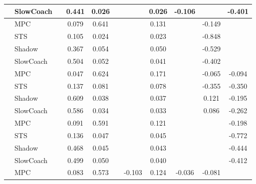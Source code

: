 \begin{tabular}{|l|l|*{9}{c|}}
                                                           & SlowCoach &       &     0.441 &     0.026 &     &     &  0.026 &  -0.106 &      &   -0.401 \\
\midrule
[False, True, True, False, False, True, False, True, False] & MPC &       &     0.079 &     0.641 &     &     &  0.131 &      &  -0.149 &       \\
                                                           & STS &       &     0.105 &     0.024 &     &     &  0.023 &      &  -0.848 &       \\
                                                           & Shadow &       &     0.367 &     0.054 &     &     &  0.050 &      &  -0.529 &       \\
                                                           & SlowCoach &       &     0.504 &     0.052 &     &     &  0.041 &      &  -0.402 &       \\
\midrule
[False, True, True, False, False, True, False, True, True] & MPC &       &     0.047 &     0.624 &     &     &  0.171 &      &  -0.065 &   -0.094 \\
                                                           & STS &       &     0.137 &     0.081 &     &     &  0.078 &      &  -0.355 &   -0.350 \\
                                                           & Shadow &       &     0.609 &     0.038 &     &     &  0.037 &      &   0.121 &   -0.195 \\
                                                           & SlowCoach &       &     0.586 &     0.034 &     &     &  0.033 &      &   0.086 &   -0.262 \\
\midrule
[False, True, True, False, False, True, False, False, True] & MPC &       &     0.091 &     0.591 &     &     &  0.121 &      &      &   -0.198 \\
                                                           & STS &       &     0.136 &     0.047 &     &     &  0.045 &      &      &   -0.772 \\
                                                           & Shadow &       &     0.468 &     0.045 &     &     &  0.043 &      &      &   -0.444 \\
                                                           & SlowCoach &       &     0.499 &     0.050 &     &     &  0.040 &      &      &   -0.412 \\
\midrule
[False, True, True, False, True, True, True, True, False] & MPC &       &     0.083 &     0.573 &     & -0.103 &  0.124 &  -0.036 &  -0.081 &       \\

\end{tabular}
